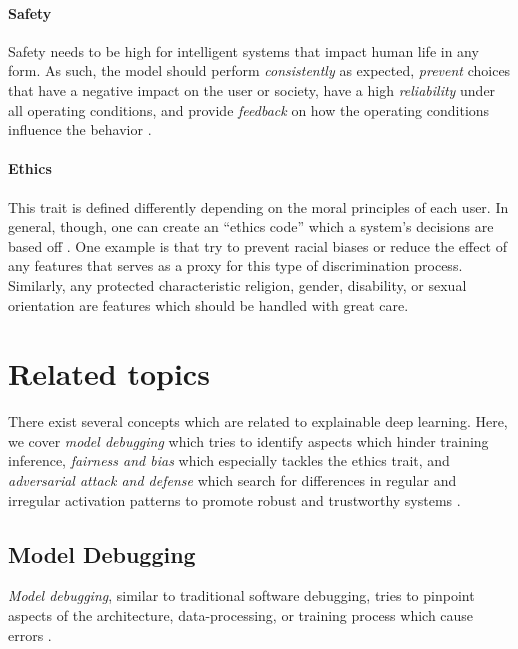 \paragraph{Safety}
Safety needs to be high for intelligent systems that impact human life in any form. As such, the model should perform \emph{consistently} as expected, \emph{prevent} choices that have a negative impact on the user or society, have a high \emph{reliability} under all operating conditions, and provide \emph{feedback} on how the operating conditions influence the behavior \citep{xie2020explainable}.

\paragraph{Ethics}
This trait is defined differently depending on the moral principles of each user. In general, though, one can create an ``ethics code'' which a system's decisions are based off \citep{xie2020explainable}. One example is that try to prevent racial biases or reduce the effect of any features that serves as a proxy for this type of discrimination process. Similarly, any protected characteristic \eg  religion, gender, disability, or sexual orientation are features which should be handled with great care.


\section{Related topics}
There exist several concepts which are related to explainable deep learning. Here, we cover \emph{model debugging} which tries to identify aspects which hinder training inference, \emph{fairness and bias} which especially tackles the ethics trait, and \emph{adversarial attack and defense} which search for differences in regular and irregular activation patterns to promote robust and trustworthy systems \citep{xie2020explainable}. 

\subsection{Model Debugging}
\emph{Model debugging}, similar to traditional software debugging, tries to pinpoint aspects of the architecture, data-processing, or training process which cause errors \citep{xie2020explainable}. 

